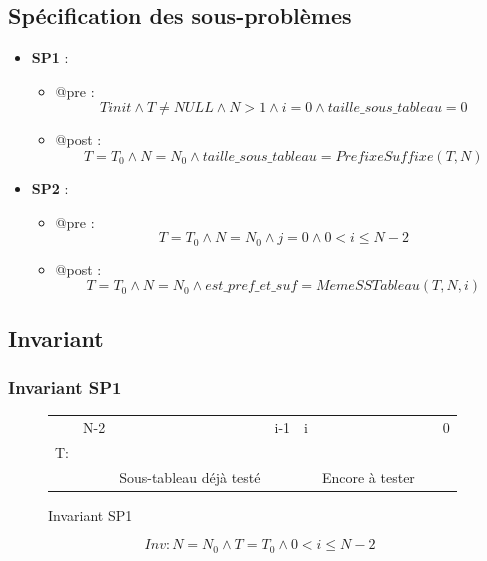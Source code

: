 \documentclass[a4paper, 11pt, oneside]{article}
\begin{document}
\subsection{Spécification des sous-problèmes}
\begin{itemize}
  \item \textbf{SP1} : 
  \begin{itemize}
    \item @pre : $$Tinit\wedge T\neq NULL \wedge N>1 \wedge i=0 \wedge taille\_sous\_tableau=0$$
    \item @post : $$T=T_0\wedge N=N_0\wedge taille\_sous\_tableau=PrefixeSuffixe (T, N)$$
  \end{itemize}
  \item \textbf{SP2} :
  \begin{itemize}
  \item @pre : $$T=T_0\wedge N=N_0\wedge j=0 \wedge 0<i\leq N-2 $$
  \item @post : $$T=T_0\wedge N=N_0\wedge est\_pref\_et\_suf=MemeSSTableau(T, N, i)$$
  \end{itemize}
\end{itemize}

\newpage

\subsection{Invariant}
\subsubsection{Invariant SP1}

\begin{figure}[h]
  \centering
  \begin{tabular}{l|lcr|lcr|l}
   & N-2 &  & \multicolumn{1}{r|}{i-1} & i &  & &0 \\ \cline{2-7}
  T: & \cellcolor[HTML]{00ff09} & \cellcolor[HTML]{00ff09} & \cellcolor[HTML]{00ff09} & \cellcolor[HTML]{a3160f} &  \cellcolor[HTML]{a3160f}& \cellcolor[HTML]{a3160f} \\ \cline{2-7}
  &&Sous-tableau déjà testé&&&Encore à tester&& \\ \cline{2-7}
  \end{tabular}
  \caption{Invariant SP1}
\end{figure}

$$Inv: N=N_0 \wedge T=T_0\wedge 0<i\leq N-2$$
\end{document}
